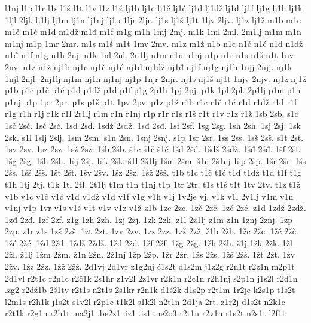 {l1nj
l1p
l1r
l1s
l1š
l1t
l1v
l1z
l1ž
lj1b
lj1c
lj1č
lj1ć
lj1d
lj1dž
lj1đ
lj1f
lj1g
lj1h
lj1k
1ljl
2ljl.
lj1lj
lj1m
lj1n
lj1nj
lj1p
1ljr
2ljr.
lj1s
lj1š
lj1t
1ljv
2ljv.
lj1z
lj1ž
m1b
m1c
m1č
m1ć
m1d
m1dž
m1đ
m1f
m1g
m1h
1mj
2mj.
m1k
1ml
2ml.
2m1lj
m1m
m1n
m1nj
m1p
1mr
2mr.
m1s
m1š
m1t
1mv
2mv.
m1z
m1ž
n1b
n1c
n1č
n1ć
n1d
n1dž
n1đ
n1f
n1g
n1h
2nj.
n1k
1nl
2nl.
2n1lj
n1m
n1n
n1nj
n1p
n1r
n1s
n1š
n1t
1nv
2nv.
n1z
n1ž
nj1b
nj1c
nj1č
nj1ć
nj1d
nj1dž
nj1đ
nj1f
nj1g
nj1h
1njj
2njj.
nj1k
1njl
2njl.
2nj1lj
nj1m
nj1n
nj1nj
nj1p
1njr
2njr.
nj1s
nj1š
nj1t
1njv
2njv.
nj1z
nj1ž
p1b
p1c
p1č
p1ć
p1d
p1dž
p1đ
p1f
p1g
2p1h
1pj
2pj.
p1k
1pl
2pl.
2p1lj
p1m
p1n
p1nj
p1p
1pr
2pr.
p1s
p1š
p1t
1pv
2pv.
p1z
p1ž
r1b
r1c
r1č
r1ć
r1d
r1dž
r1đ
r1f
r1g
r1h
r1j
r1k
r1l
2r1lj
r1m
r1n
r1nj
r1p
r1r
r1s
r1š
r1t
r1v
r1z
r1ž
1sb
2sb.
s1c
1sč
2sč.
1sć
2sć.
1sd
2sd.
1sdž
2sdž.
1sđ
2sđ.
1sf
2sf.
1sg
2sg.
1sh
2sh.
1sj
2sj.
1sk
2sk.
s1l
1slj
2slj.
1sm
2sm.
s1n
2sn.
1snj
2snj.
s1p
1sr
2sr.
1ss
2ss.
1sš
2sš.
s1t
2st.
1sv
2sv.
1sz
2sz.
1sž
2sž.
1šb
2šb.
š1c
š1č
š1ć
1šd
2šd.
1šdž
2šdž.
1šđ
2šđ.
1šf
2šf.
1šg
2šg.
1šh
2šh.
1šj
2šj.
1šk
2šk.
š1l
2š1lj
1šm
2šm.
š1n
2š1nj
1šp
2šp.
1šr
2šr.
1šs
2šs.
1šš
2šš.
1št
2št.
1šv
2šv.
1šz
2šz.
1šž
2šž.
t1b
t1c
t1č
t1ć
t1d
t1dž
t1đ
t1f
t1g
t1h
1tj
2tj.
t1k
1tl
2tl.
2t1lj
t1m
t1n
t1nj
t1p
1tr
2tr.
t1s
t1š
t1t
1tv
2tv.
t1z
t1ž
v1b
v1c
v1č
v1ć
v1d
v1dž
v1đ
v1f
v1g
v1h
v1j
1v2je
vj.
v1k
v1l
2v1lj
v1m
v1n
v1nj
v1p
1vr
v1s
v1š
v1t
v1v
v1z
v1ž
z1b
1zc
2zc.
1zč
2zč.
1zć
2zć.
z1d
1zdž
2zdž.
1zđ
2zđ.
1zf
2zf.
z1g
1zh
2zh.
1zj
2zj.
1zk
2zk.
z1l
2z1lj
z1m
z1n
1znj
2znj.
1zp
2zp.
z1r
z1s
1zš
2zš.
1zt
2zt.
1zv
2zv.
1zz
2zz.
1zž
2zž.
ž1b
2žb.
1žc
2žc.
1žč
2žč.
1žć
2žć.
1žd
2žd.
1ždž
2ždž.
1žđ
2žđ.
1žf
2žf.
1žg
2žg.
1žh
2žh.
ž1j
1žk
2žk.
1žl
2žl.
ž1lj
1žm
2žm.
ž1n
2žn.
2ž1nj
1žp
2žp.
1žr
2žr.
1žs
2žs.
1žš
2žš.
1žt
2žt.
1žv
2žv.
1žz
2žz.
1žž
2žž.
2d1vj
2d1vr
z1g2nj
ć1s2t
d1s2m
j1z2g
r2n1t
r2z1n
m2p1t
2d1vl
r2t1c
r2n1c
r2č1k
2s1hr
z1v2l
2z1vr
r2k1n
r2c1n
r2h1nj
s2p1n
j1s2l
r2d1n
.zg2
r2dž1b
2š1tv
r2t1s
n2t1s
2s1kr
r2n1k
d1š2k
d1s2p
r2t1m
1r2je
k2s1p
t1s2t
l2m1s
r2h1k
j1s2t
s1v2l
r2p1c
t1k2l
s1k2l
n2t1n
2d1ja
2rt.
z1r2j
d1s2t
n2k1c
r2t1k
r2g1n
r2h1t
.na2j1
.be2z1
.iz1
.is1
.ne2o3
r2t1n
r2v1n
r1s2t
n2s1t
l2f1t
}
